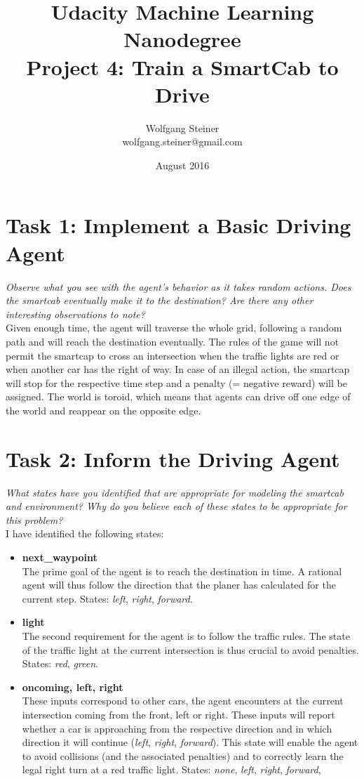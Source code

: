 \documentclass[11pt]{article}
\title{Udacity Machine Learning Nanodegree\\ Project 4: Train a SmartCab to Drive}
\author{Wolfgang Steiner \\ \small{wolfgang.steiner@gmail.com}}
\date{August 2016}
\begin{document}
\maketitle

\section*{Task 1: Implement a Basic Driving Agent}
\textit{Observe what you see with the agent's behavior as it takes random actions. Does the smartcab eventually make it to the destination? Are there any other interesting observations to note?}\\

Given enough time, the agent will traverse the whole grid, following a random path and will reach the destination eventually. The rules of the game will not permit the smartcap to cross an intersection when the traffic lights are red or when another car has the right of way.
In case of an illegal action, the smartcap will stop for the respective time step and a penalty (= negative reward) will be assigned. The world is toroid, which means that agents can drive off one edge of the world and reappear on the opposite edge. 

\section*{Task 2: Inform the Driving Agent}
\textit{What states have you identified that are appropriate for modeling the smartcab and environment? Why do you believe each of these states to be appropriate for this problem?}\\

I have identified the following states:
\begin{itemize}
    \item \textbf{next\_waypoint} \\
        The prime goal of the agent is to reach the destination in time. A rational agent will thus follow the direction that the planer has calculated for the current step. States: \textit{left}, \textit{right}, \textit{forward}.
    
    \item \textbf{light} \\
        The second requirement for the agent is to follow the traffic rules. The state of the traffic light at the current intersection is thus crucial to avoid penalties. States: \textit{red}, \textit{green}.

    \item \textbf{oncoming, left, right} \\
        These inputs correspond to other cars, the agent encounters at the current intersection coming from the front, left or right. These inputs will report whether a car is approaching from the respective direction and in which direction it will continue (\textit{left}, \textit{right}, \textit{forward}). This state will enable the agent to avoid collisions (and the associated penalties) and to correctly learn the legal right turn at a red traffic light. States: \textit{none}, \textit{left}, \textit{right}, \textit{forward},

\end{itemize}
\end{document}
